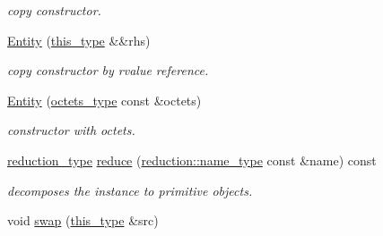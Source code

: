 \begin{DoxyCompactItemize}
\begin{DoxyCompactList}\small\item\em copy constructor. \end{DoxyCompactList}\item 
\hypertarget{classhryky_1_1uri_1_1query_1_1_entity_a6b90e5da838efee6e939091ffd5e58fd}{\hyperlink{classhryky_1_1uri_1_1query_1_1_entity_a6b90e5da838efee6e939091ffd5e58fd}{Entity} (\hyperlink{classhryky_1_1uri_1_1query_1_1_entity_a169f59d5b5b0d125a9128047e916f802}{this\-\_\-type} \&\&rhs)}\label{classhryky_1_1uri_1_1query_1_1_entity_a6b90e5da838efee6e939091ffd5e58fd}

\begin{DoxyCompactList}\small\item\em copy constructor by rvalue reference. \end{DoxyCompactList}\item 
\hypertarget{classhryky_1_1uri_1_1query_1_1_entity_a250b93519f4d1b9973a3208acc3eae8b}{\hyperlink{classhryky_1_1uri_1_1query_1_1_entity_a250b93519f4d1b9973a3208acc3eae8b}{Entity} (\hyperlink{classhryky_1_1_vector}{octets\-\_\-type} const \&octets)}\label{classhryky_1_1uri_1_1query_1_1_entity_a250b93519f4d1b9973a3208acc3eae8b}

\begin{DoxyCompactList}\small\item\em constructor with octets. \end{DoxyCompactList}\item 
\hypertarget{classhryky_1_1uri_1_1query_1_1_entity_a91a3e23305fa6240b2a19d29f9fe9610}{\hyperlink{namespacehryky_a343a9a4c36a586be5c2693156200eadc}{reduction\-\_\-type} \hyperlink{classhryky_1_1uri_1_1query_1_1_entity_a91a3e23305fa6240b2a19d29f9fe9610}{reduce} (\hyperlink{namespacehryky_1_1reduction_ac686c30a4c8d196bbd0f05629a6b921f}{reduction\-::name\-\_\-type} const \&name) const }\label{classhryky_1_1uri_1_1query_1_1_entity_a91a3e23305fa6240b2a19d29f9fe9610}

\begin{DoxyCompactList}\small\item\em decomposes the instance to primitive objects. \end{DoxyCompactList}\item 
\hypertarget{classhryky_1_1uri_1_1query_1_1_entity_a078a7930cef140ee4a0f01eebb4a2926}{void \hyperlink{classhryky_1_1uri_1_1query_1_1_entity_a078a7930cef140ee4a0f01eebb4a2926}{swap} (\hyperlink{classhryky_1_1uri_1_1query_1_1_entity_a169f59d5b5b0d125a9128047e916f802}{this\-\_\-type} \&src)}\label{classhryky_1_1uri_1_1query_1_1_entity_a078a7930cef140ee4a0f01eebb4a2926}


\end{DoxyCompactItemize}
